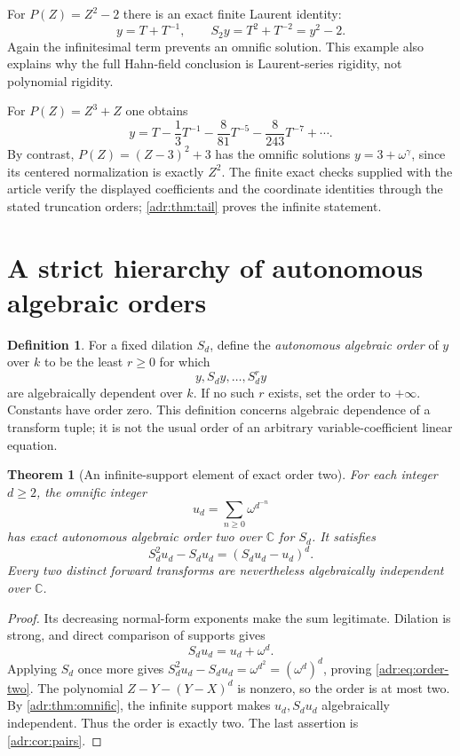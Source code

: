 \documentclass[11pt,letterpaper]{article}
\numberwithin{equation}{section}
\newtheorem{theorem}{Theorem}[section]
\theoremstyle{definition}
\newtheorem{definition}[definition]{Definition}
\theoremstyle{remark}
\newcommand{\C}{\mathbb C}
\begin{document}
For $P(Z)=Z^2-2$ there is an exact finite Laurent identity:
\[
 y=T+T^{-1},\qquad S_2y=T^2+T^{-2}=y^2-2.
\]
Again the infinitesimal term prevents an omnific solution. This example
also explains why the full Hahn-field conclusion is Laurent-series
rigidity, not polynomial rigidity.

For $P(Z)=Z^3+Z$ one obtains
\[
 y=T-\frac13T^{-1}-\frac8{81}T^{-5}-\frac8{243}T^{-7}+\cdots.
\]
By contrast, $P(Z)=(Z-3)^2+3$ has the omnific solutions
$y=3+\omega^\gamma$, since its centered normalization is exactly $Z^2$.
The finite exact checks supplied with the article verify the displayed
coefficients and the coordinate identities through the stated truncation
orders; \cref{adr:thm:tail} proves the infinite statement.

\section{A strict hierarchy of autonomous algebraic orders}
\label{adr:sec:order}

\begin{definition}
For a fixed dilation $S_d$, define the \emph{autonomous algebraic order}
of $y$ over $k$ to be the least $r\ge0$ for which
\[
 y,S_dy,\ldots,S_d^r y
\]
are algebraically dependent over $k$. If no such $r$ exists, set the
order to $+\infty$. Constants have order zero. This definition concerns
algebraic dependence of a transform tuple; it is not the usual order of
an arbitrary variable-coefficient linear equation.
\end{definition}

\begin{theorem}[An infinite-support element of exact order two]
\label{adr:thm:order-two}
For each integer $d\ge2$, the omnific integer
\[
 u_d=\sum_{n\ge0}\omega^{d^{-n}}
\]
has exact autonomous algebraic order two over $\C$ for $S_d$. It satisfies
\begin{equation}\label{adr:eq:order-two}
 S_d^2u_d-S_du_d=(S_du_d-u_d)^d.
\end{equation}
Every two distinct forward transforms are nevertheless algebraically
independent over $\C$.
\end{theorem}
\begin{proof}
Its decreasing normal-form exponents make the sum legitimate. Dilation
is strong, and direct comparison of supports gives
\[
 S_du_d=u_d+\omega^d.
\]
Applying $S_d$ once more gives
$S_d^2u_d-S_du_d=\omega^{d^2}=(\omega^d)^d$, proving
\eqref{adr:eq:order-two}. The polynomial
$Z-Y-(Y-X)^d$ is nonzero, so the order is at most two.
By \cref{adr:thm:omnific}, the infinite support makes $u_d,S_du_d$
algebraically independent. Thus the order is exactly two.
The last assertion is \cref{adr:cor:pairs}.
\end{proof}
\end{document}
